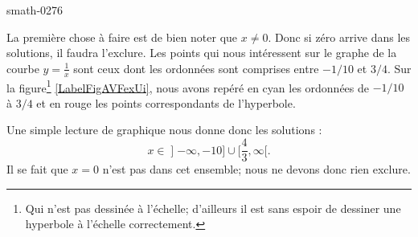 
\begin{corrige}{smath-0276}


    La première chose à faire est de bien noter que \( x\neq 0\). Donc si zéro arrive dans les solutions, il faudra l'exclure. Les points qui nous intéressent sur le graphe de la courbe \( y=\frac{1}{ x }\) sont ceux dont les ordonnées sont comprises entre \( -1/10\) et \( 3/4\). Sur la figure\footnote{Qui n'est pas dessinée à l'échelle; d'ailleurs il est sans espoir de dessiner une hyperbole à l'échelle correctement.} \ref{LabelFigAVFexUi}, nous avons repéré en cyan les ordonnées de \( -1/10\) à $3/4$ et en rouge les points correspondants de l'hyperbole.

\newcommand{\CaptionFigAVFexUi}{Résolution de l'exercice \ref{exosmath-0276}.}


Une simple lecture de graphique nous donne donc les solutions :
\begin{equation}
    x\in\mathopen] -\infty , -10 \mathclose]\cup \mathopen[ \frac{ 4 }{ 3 } , \infty [.
\end{equation}
Il se fait que \( x=0\) n'est pas dans cet ensemble; nous ne devons donc rien exclure.

\end{corrige}
